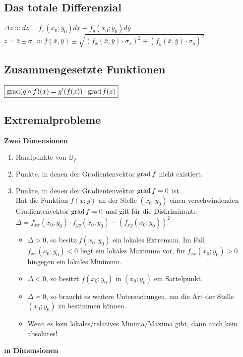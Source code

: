 \subsection{Das totale Differenzial}
$\boxed{\Delta z \approx dz=f_x(x_0;y_0)dx+f_y(x_0;y_0)dy}$\\
$\boxed{z=\bar z \pm \sigma_{\bar z} \approx f(\bar x, \bar y) \pm
\sqrt{(f_x(\bar x,\bar y)\cdot \sigma_{\bar x})^2+(f_y(\bar x,\bar y)\cdot
\sigma_{\bar y})^2}}$

\subsection{Zusammengesetzte Funktionen}
$\boxed{\operatorname{grad}(g\circ f)(x)=g'(f(x))\cdot \operatorname{grad} f(x)}$
\newpage

\subsection{Extremalprobleme}
\textbf{Zwei Dimensionen}\\
\begin{enumerate}
  \item Randpunkte von $\mathbb{D}_f$
  \item Punkte, in denen der Gradientenvektor $\operatorname{grad} f$ nicht existiert. 
  \item Punkte, in denen der Gradientenvektor $\operatorname{grad} f=0$ ist.\\
  Hat die Funktion $f(x;y)$ an der Stelle $(x_0;y_0)$ einen verschwindenden Gradientenvektor $\operatorname{grad} f = 0$ und gilt für die Diskriminante $\Delta = f_{xx}    (x_0;y_0) \cdot f_{yy}(x_0;y_0) -  (f_{xy}(x_0;y_0))^2$
  \begin{itemize}
    \item $\Delta > 0 $, so besitz $f(x_0;y_0)$ ein lokales Extremum. Im Fall $f_{xx}(x_0;y_0) < 0$ liegt ein lokales Maximum vor, für $f_{xx}(x_0;y_0) >       0$ hingegen ein lokales Minimum.
    \item $\Delta < 0 $, so besitzt $f(x_0;y_0)$ in $(x_0;y_0)$ ein Sattelpunkt.
    \item $\Delta = 0 $, so braucht es weitere Untersuchungen, um die Art der Stelle $(x_0;y_0)$ zu bestimmen können.
    \item Wenn es kein lokales/relatives Minima/Maxima gibt, dann auch kein
    absolutes! 
  \end{itemize}
\end{enumerate}
\textbf{m Dimensionen}\\
